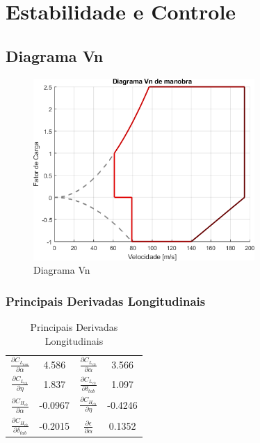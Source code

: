 \chapter{Estabilidade e Controle}
\label{estabilidade}

\section{Diagrama Vn}
\label{diagramavn}

\begin{figure}[H]
\centering
\includegraphics[width=0.75\textwidth]{images/parte3/diagramavn_asalimpa.png}
\caption[Diagrama Vn]{Diagrama Vn}
\label{fig:diagramavn}
\end{figure}

\subsection{Principais Derivadas Longitudinais}
\label{derivadas}

\begin{table}[H]
\centering
\begin{tabular}{cccc}
\toprule
$ \frac{\partial C_{L_{asa}}}{\partial \alpha} $ & 4.586 & $ \frac{\partial C_{L_{eh}}}{\partial \alpha} $ & 3.566 \\ [0.3cm]
$ \frac{\partial C_{L_{eh}}}{\partial \eta} $ & 1.837 & $ \frac{\partial C_{L_{eh}}}{\partial \delta_{tab}} $ & 1.097 \\ [0.3cm]
$ \frac{\partial C_{H_{eh}}}{\partial \alpha} $ & -0.0967  & $ \frac{\partial C_{H_{eh}}}{\partial \eta} $ & -0.4246 \\ [0.3cm]
$ \frac{\partial C_{H_{eh}}}{\partial \delta_{tab}} $ & -0.2015 & $ \frac{\partial \epsilon}{\partial \alpha} $ & 0.1352 \\ [0.3cm]
\bottomrule
\end{tabular}
\caption[Principais Derivadas Longitudinais]{Principais Derivadas Longitudinais}
\label{tbl:derivadas}
\end{table}

